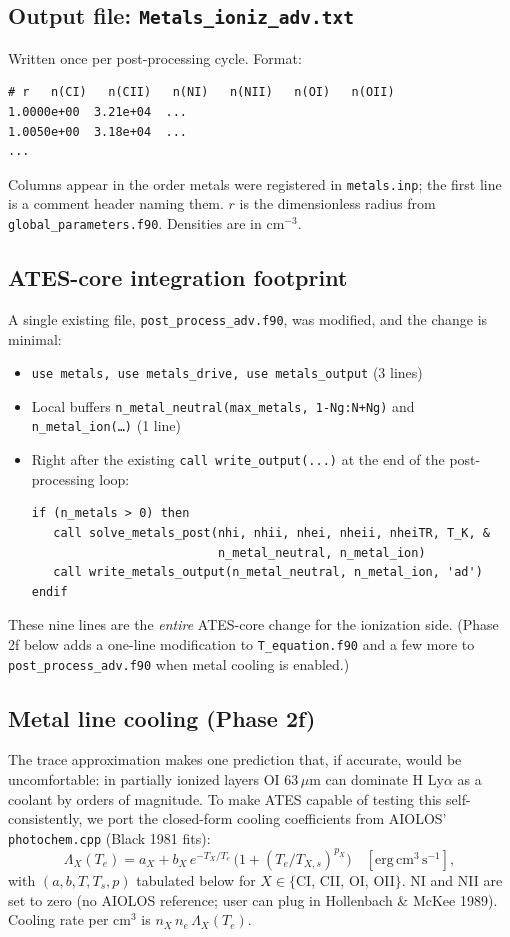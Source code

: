 \documentclass[english,a4paper]{kiseon_memo}
\begin{document}
\subsection{Output file: \texttt{Metals\_ioniz\_adv.txt}}

Written once per post-processing cycle. Format:
\begin{verbatim}
# r   n(CI)   n(CII)   n(NI)   n(NII)   n(OI)   n(OII)
1.0000e+00  3.21e+04  ...
1.0050e+00  3.18e+04  ...
...
\end{verbatim}

Columns appear in the order metals were registered in \texttt{metals.inp};
the first line is a comment header naming them. $r$ is the dimensionless
radius from \texttt{global\_parameters.f90}. Densities are in cm$^{-3}$.

\subsection{ATES-core integration footprint}

A single existing file, \texttt{post\_process\_adv.f90}, was modified, and
the change is minimal:
\begin{itemize}
\item \texttt{use metals, use metals\_drive, use metals\_output} (3 lines)
\item Local buffers \texttt{n\_metal\_neutral(max\_metals, 1-Ng:N+Ng)}
and \texttt{n\_metal\_ion(\dots)} (1 line)
\item Right after the existing \texttt{call write\_output(...)} at the end
of the post-processing loop:
\begin{verbatim}
if (n_metals > 0) then
   call solve_metals_post(nhi, nhii, nhei, nheii, nheiTR, T_K, &
                          n_metal_neutral, n_metal_ion)
   call write_metals_output(n_metal_neutral, n_metal_ion, 'ad')
endif
\end{verbatim}
\end{itemize}

These nine lines are the \emph{entire} ATES-core change for the
ionization side. (Phase 2f below adds a one-line modification to
\texttt{T\_equation.f90} and a few more to \texttt{post\_process\_adv.f90}
when metal cooling is enabled.)

\subsection{Metal line cooling (Phase 2f)}

The trace approximation makes one prediction that, if accurate, would
be uncomfortable: in partially ionized layers OI 63\,$\mu$m can dominate
H Ly$\alpha$ as a coolant by orders of magnitude. To make ATES capable
of testing this self-consistently, we port the closed-form cooling
coefficients from AIOLOS' \texttt{photochem.cpp} (Black 1981 fits):
\[
\Lambda_X(T_e) = a_X + b_X\,e^{-T_X/T_e}\,\big(1 + (T_e/T_{X,\!s})^{p_X}\big)
\quad [\mathrm{erg\,cm^3\,s^{-1}}],
\]
with $(a, b, T, T_s, p)$ tabulated below for $X\in\{$CI, CII, OI, OII$\}$.
NI and NII are set to zero (no AIOLOS reference; user can plug in
Hollenbach \& McKee 1989). Cooling rate per cm$^3$ is $n_X\,n_e\,\Lambda_X(T_e)$.
\end{document}
